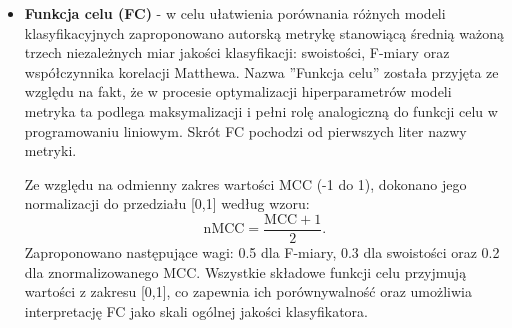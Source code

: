\documentclass[a4paper,twoside,12pt]{book}
\begin{document}
\begin{itemize}
	      W skrajnie niekorzystnym przypadku, gdy krzywa ROC znajduje się poniżej tej przekątnej, oznacza to, że klasyfikator częściej się myli, niż przewiduje poprawnie. Paradoksalnie, odwrócenie jego predykcj poprawia skuteczność klasyfikacji.

	      Wraz ze zmniejszaniem wartości progu decyzyjnego rośnie czułość modelu, co oznacza spadek liczby błędów drugiego rodzaju. Jednocześnie jednak rośnie liczba błędów pierwszego rodzaju - fałszywie pozytywnych wyników. Z kolei zwiększanie progu skutkuje sytuacją odwrotną: poprawia się swoistość, ale kosztem spadku czułości.

	      Taką sytuację określa się jako kompromis między czułością a swoistością. Optymalny próg zależy od charakterystyki problemu oraz kosztów błędnych decyzji. W zastosowaniach medycznych często preferuje się modele o wysokiej czułości, aby ograniczyć liczbę niewykrytych przypadków choroby, nawet kosztem większej liczby fałszywych alarmów.

	      Wykorzystując krzywą ROC, możliwe jest obliczenie pod nią. Taka matryka nazywa się \textbf{AUC}. Jest ona zależna i od czułości i od swoistości, więc nie ma na nią wpływu niezbalansowanie klas. Jednak,  AUC może prowadzić do mylących wniosków w przypadku przecinających się krzywych ROC, gdzie jeden model może być lepsza w jednym zakresie wartości progu decyzyjnego, a gorsza w innym. W takich sytuacjach wykorzystuje się analizę fragmentaryczną~\cite{mcclish1989roc}.


	\item \textbf{Funkcja celu (FC)} - w celu ułatwienia porównania różnych modeli klasyfikacyjnych zaproponowano autorską metrykę stanowiącą średnią ważoną trzech niezależnych miar jakości klasyfikacji: swoistości, F-miary oraz współczynnika korelacji Matthewa. Nazwa ''Funkcja celu'' została przyjęta ze względu na fakt, że w procesie optymalizacji hiperparametrów modeli metryka ta podlega maksymalizacji i pełni rolę analogiczną do funkcji celu w programowaniu liniowym. Skrót FC pochodzi od pierwszych liter nazwy metryki.





	      Ze względu na odmienny zakres wartości MCC (\mbox{-1} do 1), dokonano jego normalizacji do przedziału [0,1] według wzoru:
	      \begin{equation}
		      \text{nMCC} = \frac{\text{MCC} + 1}{2}.
	      \end{equation}
	      Zaproponowano następujące wagi: 0.5 dla F-miary, 0.3 dla swoistości oraz 0.2 dla znormalizowanego MCC. Wszystkie składowe funkcji celu przyjmują wartości z zakresu [0,1], co zapewnia ich porównywalność oraz umożliwia interpretację FC jako skali ogólnej jakości klasyfikatora.


\end{itemize}
\end{document}
